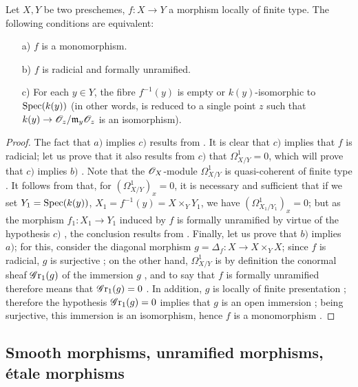 \begin{proposition}[17.2.6]
\label{IV.17.2.6}
Let $X, Y$ be two preschemes, $f: X \to Y$ a morphism locally of finite type. 
The following conditions are equivalent:
\begin{enumerate}
\item[a)] $f$ is a monomorphism.
\item[b)] $f$ is radicial and formally unramified.
\item[c)] For each $y \in Y$, the fibre $f^{-1}(y)$ is empty or $k(y)$-isomorphic to ${\mathop{\mathrm{Spec}}\nolimits}(k(y))$ (in other words, is reduced to a single point $z$ such that $k(y) \to \sh{O}_z/\mathfrak{m}_y\sh{O}_z$ is an isomorphism).
\end{enumerate}
\end{proposition}

\begin{proof}
The fact that $a)$ implies $c)$ results from . 
It is clear that $c)$ implies that $f$ is radicial; let us prove that it also results from $c)$ that $\Omega^1 _{X/Y} = 0$, which will prove that $c)$ implies $b)$ .
Note that the $\mathscr{O}_X$-module $\Omega^1 _{X/Y}$ is quasi-coherent of finite type .
It follows from  that, for $(\Omega^1 _{X/Y})_x = 0$, it is necessary and sufficient that if we set $Y_1 = {\mathop{\mathrm{Spec}}\nolimits}(k(y))$, $X_1 = f^{-1}(y) = X \times_{Y} Y_1$, we have $(\Omega^1 _{X_1/Y_1})_x = 0$; but as the morphism $f_1 : X_1 \to Y_1$ induced by $f$ is formally unramified by virtue of the hypothesis $c)$ , the conclusion results from . Finally, let us prove that $b)$ implies $a)$; for this, consider the diagonal morphism $g = \Delta_f : X \to X \times_{Y} X$; since $f$ is radicial, $g$ is surjective ; on the other hand, $\Omega^1 _{X/Y}$ is by definition the conormal sheaf $\operatorname{\mathscr{G}r_1}(g)$ %
of the immersion $g$ , and to say that $f$ is formally unramified therefore means that $\operatorname{\mathscr{G}r_1}(g) = 0$ . 
In addition, $g$ is locally of finite presentation ; therefore the hypothesis $\operatorname{\mathscr{G}r_1}(g) = 0$ implies that $g$ is an open immersion ; being surjective, this immersion is an isomorphism, hence $f$ is a monomorphism .
\end{proof}

\subsection{Smooth morphisms, unramified morphisms, \'etale morphisms}
\label{subsection:IV.17.3}

